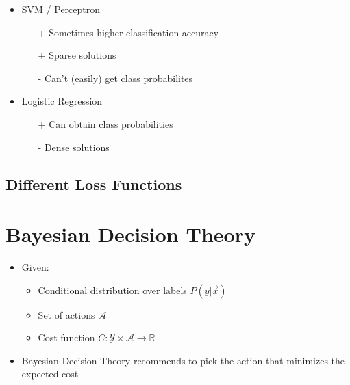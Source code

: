 \documentclass[8pt,a4paper]{scrartcl}
\begin{document}
\begin{multicols*}{3}
\begin{itemize}
\ncompaq
\item SVM / Perceptron
\begin{itemize}
\ncompaq
\item[+] Sometimes higher classification accuracy
\item[+] Sparse solutions
\item[-] Can't (easily) get class probabilites
\end{itemize}
\item Logistic Regression
\begin{itemize}
\ncompaq
\item[+] Can obtain class probabilities
\item[-] Dense solutions
\end{itemize}
\end{itemize}

\subsection{Different Loss Functions}

\begin{center}
\end{center}

\section{Bayesian Decision Theory}

\begin{itemize}
\ncompaq
\item Given:
\begin{itemize}
\ncompaq
\item Conditional distribution over labels $P(y|\vec{x})$
\item Set of actions $\mathcal{A}$
\item Cost function $C:\mathcal{Y}\times\mathcal{A}\rightarrow\mathbb{R}$
\end{itemize}
\item Bayesian Decision Theory recommends to pick the action that minimizes the expected cost


\end{itemize}
\end{multicols*}
\end{document}
